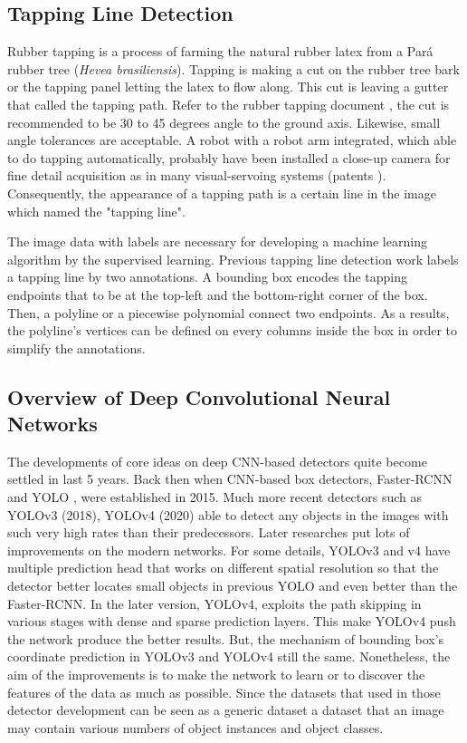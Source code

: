 \documentclass[default,pdflatex,iicol]{sn-jnl}%
\begin{document}
\subsection{Tapping Line Detection}
Rubber tapping is a process of farming the natural rubber latex from a Pará rubber tree (\textit{Hevea brasiliensis}). Tapping is making a cut on the rubber tree bark or the tapping panel letting the latex to flow along. This cut is leaving a gutter that called the tapping path. Refer to the rubber tapping document \cite{abraham1992tapping}, the cut is recommended to be 30 to 45 degrees angle to the ground axis. Likewise, small angle tolerances are acceptable. A robot with a robot arm integrated, which able to do tapping automatically, probably have been installed a close-up camera for fine detail acquisition as in many visual-servoing systems (patents \cite{patent1, patent2, patent3}). Consequently, the appearance of a tapping path is a certain line in the image which named the "tapping line".

The image data with labels are necessary for developing a machine learning algorithm by the supervised learning. Previous tapping line detection work \cite{Wongtanawijit_2021} labels a tapping line by two annotations. A bounding box encodes the tapping endpoints that to be at the top-left and the bottom-right corner of the box. Then, a polyline or a piecewise polynomial connect two endpoints. As a results, the polyline's vertices can be defined on every columns inside the box in order to simplify the annotations.

\subsection{Overview of Deep Convolutional Neural Networks}
The developments of core ideas on deep CNN-based detectors quite become settled in last 5 years. Back then when CNN-based box detectors, Faster-RCNN \cite{fasterrcnn} and YOLO \cite{redmonyolov1}, were established in 2015. Much more recent detectors such as YOLOv3 \cite{redmonyolov3} (2018), YOLOv4 \cite{alexyyolov4} (2020) able to detect any objects in the images with such very high rates than their predecessors. Later researches put lots of improvements on the modern networks. For some details, YOLOv3 and v4 have multiple prediction head that works on different spatial resolution so that the detector better locates small objects in previous YOLO and even better than the Faster-RCNN. In the later version, YOLOv4, exploits the path skipping in various stages with dense and sparse prediction layers. This make YOLOv4 push the network produce the better results. But, the mechanism of bounding box's coordinate prediction in YOLOv3 and YOLOv4 still the same. Nonetheless, the aim of the improvements is to make the network to learn or to discover the features of the data as much as possible. Since the datasets that used in those detector development can be seen as a generic dataset \textemdash a dataset that an image may contain various numbers of object instances and object classes. 
\end{document}
